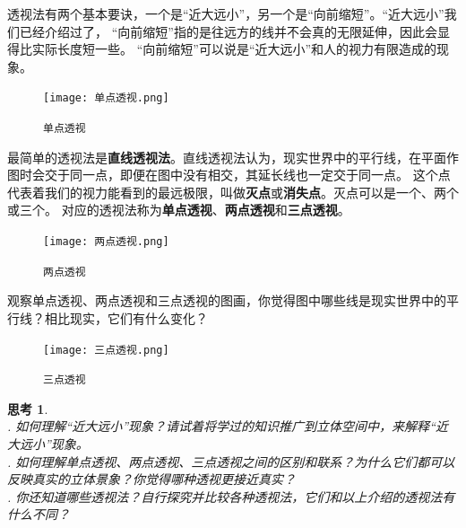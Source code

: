 \documentclass[12pt,UTF8]{ctexbook}
\newtheorem{sk}{思考}[section]
\begin{document}
透视法有两个基本要诀，一个是“近大远小”，另一个是“向前缩短”。“近大远小”我们已经介绍过了，
“向前缩短”指的是往远方的线并不会真的无限延伸，因此会显得比实际长度短一些。
“向前缩短”可以说是“近大远小”和人的视力有限造成的现象。

\begin{figure}[h] %
    \centering
    \texttt{[image: 单点透视.png]}
    \caption*{\texttt{单点透视}}
\end{figure}

最简单的透视法是\textbf{直线透视法}。直线透视法认为，现实世界中的平行线，在平面作图时会交于同一点，即便在图中没有相交，其延长线也一定交于同一点。
这个点代表着我们的视力能看到的最远极限，叫做\textbf{灭点}或\textbf{消失点}。灭点可以是一个、两个或三个。
对应的透视法称为\textbf{单点透视}、\textbf{两点透视}和\textbf{三点透视}。

\begin{figure}[h] %
    \vspace{-4pt}
    \centering
    \texttt{[image: 两点透视.png]}
    \caption*{\texttt{两点透视}}
\end{figure}

观察单点透视、两点透视和三点透视的图画，你觉得图中哪些线是现实世界中的平行线？相比现实，它们有什么变化？

\begin{figure}[h] %
    \vspace{4pt}
    \centering
    \texttt{[image: 三点透视.png]}
    \caption*{\texttt{三点透视}}
\end{figure}


\begin{sk}
    \mbox{}\\
    . 如何理解“近大远小”现象？请试着将学过的知识推广到立体空间中，来解释“近大远小”现象。\\
    . 如何理解单点透视、两点透视、三点透视之间的区别和联系？为什么它们都可以反映真实的立体景象？你觉得哪种透视更接近真实？\\
    . 你还知道哪些透视法？自行探究并比较各种透视法，它们和以上介绍的透视法有什么不同？
\end{sk}
\end{document}
